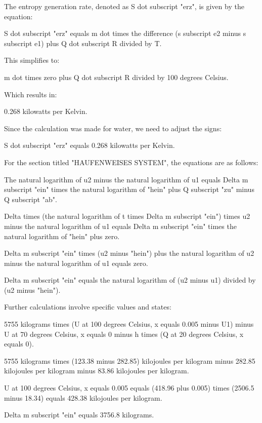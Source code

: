 The entropy generation rate, denoted as S dot subscript "erz", is given by the equation:

S dot subscript "erz" equals m dot times the difference (s subscript e2 minus s subscript e1) plus Q dot subscript R divided by T.

This simplifies to:

m dot times zero plus Q dot subscript R divided by 100 degrees Celsius.

Which results in:

0.268 kilowatts per Kelvin.

Since the calculation was made for water, we need to adjust the signs:

S dot subscript "erz" equals 0.268 kilowatts per Kelvin.

For the section titled "HAUFENWEISES SYSTEM", the equations are as follows:

The natural logarithm of u2 minus the natural logarithm of u1 equals Delta m subscript "ein" times the natural logarithm of "hein" plus Q subscript "zu" minus Q subscript "ab".

Delta times (the natural logarithm of t times Delta m subscript "ein") times u2 minus the natural logarithm of u1 equals Delta m subscript "ein" times the natural logarithm of "hein" plus zero.

Delta m subscript "ein" times (u2 minus "hein") plus the natural logarithm of u2 minus the natural logarithm of u1 equals zero.

Delta m subscript "ein" equals the natural logarithm of (u2 minus u1) divided by (u2 minus "hein").

Further calculations involve specific values and states:

5755 kilograms times (U at 100 degrees Celsius, x equals 0.005 minus U1) minus U at 70 degrees Celsius, x equals 0 minus h times (Q at 20 degrees Celsius, x equals 0).

5755 kilograms times (123.38 minus 282.85) kilojoules per kilogram minus 282.85 kilojoules per kilogram minus 83.86 kilojoules per kilogram.

U at 100 degrees Celsius, x equals 0.005 equals (418.96 plus 0.005) times (2506.5 minus 18.34) equals 428.38 kilojoules per kilogram.

Delta m subscript "ein" equals 3756.8 kilograms.